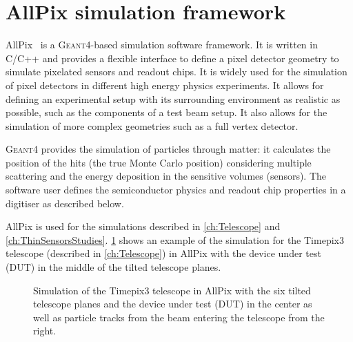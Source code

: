 \section{AllPix simulation framework}
\label{sec:AllPix}

AllPix~\cite{Benoit:1474878,allpix,allpixTwiki} is a
\textsc{Geant4}-based simulation software framework. It is written in
C/C++ and provides a flexible interface to define a pixel detector
geometry to simulate pixelated sensors and readout chips. It is widely
used for the simulation of pixel detectors in different high energy
physics experiments. It allows for defining an experimental setup with
its surrounding environment as realistic as possible, such as the
components of a test beam setup. It also allows for the simulation of
more complex geometries such as a full vertex detector.

\textsc{Geant4} provides the simulation of particles through matter:
it calculates the position of the hits (the true Monte Carlo position)
considering multiple scattering and the energy deposition in the
sensitive volumes (sensors). The software user defines the
semiconductor physics and readout chip properties in a digitiser as
described below.

AllPix is used for the simulations described in \cref{ch:Telescope}
and \cref{ch:ThinSensorsStudies}. \cref{fig:TPX3TelescopeAllpix} shows
an example of the simulation for the Timepix3 telescope (described in
\cref{ch:Telescope}) in AllPix with the device under test (DUT) in the
middle of the tilted telescope planes.

\begin{figure}[htbp]
  \centering
  \caption{Simulation of the Timepix3 telescope in AllPix with the six
    tilted telescope planes and the device under test (DUT) in the
    center as well as particle tracks from the beam entering the
    telescope from the right.}
  \label{fig:TPX3TelescopeAllpix}
\end{figure}


